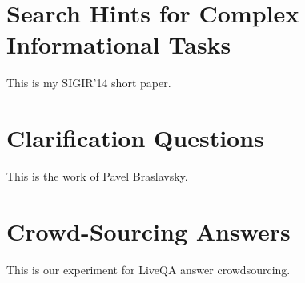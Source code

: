 %


\section{Search Hints for Complex Informational Tasks}

This is my SIGIR'14 short paper.

\section{Clarification Questions}

This is the work of Pavel Braslavsky.


\section{Crowd-Sourcing Answers}

This is our experiment for LiveQA answer crowdsourcing.

